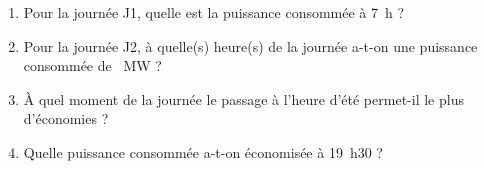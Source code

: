 \medskip

\begin{enumerate}
\item Pour la journée J1, quelle est la puissance consommée à 7~h ?
\item Pour la journée J2, à quelle(s) heure(s) de la journée a-t-on une puissance
consommée de ~MW ?
\item À quel moment de la journée le passage à l'heure d'été permet-il le plus
d'économies ?
\item Quelle puissance consommée a-t-on économisée à 19~h30 ?
\end{enumerate}

\vspace{0,5cm}

